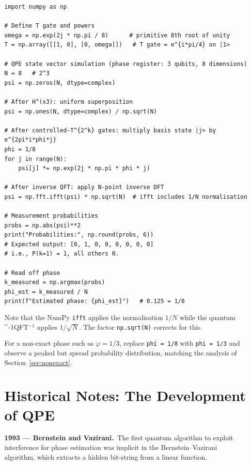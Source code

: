 \documentclass[12pt,a4paper]{article}
\newcommand{\IQFT}{\ifmmode \text{\textsc{QFT}}^{-1}\else \textsc{QFT}$^{-1}$\fi}
\begin{document}
\begin{verbatim}
import numpy as np

# Define T gate and powers
omega = np.exp(2j * np.pi / 8)      # primitive 8th root of unity
T = np.array([[1, 0], [0, omega]])   # T gate = e^{i*pi/4} on |1>

# QPE state vector simulation (phase register: 3 qubits, 8 dimensions)
N = 8   # 2^3
psi = np.zeros(N, dtype=complex)

# After H^(x3): uniform superposition
psi = np.ones(N, dtype=complex) / np.sqrt(N)

# After controlled-T^{2^k} gates: multiply basis state |j> by e^{2pi*i*phi*j}
phi = 1/8
for j in range(N):
    psi[j] *= np.exp(2j * np.pi * phi * j)

# After inverse QFT: apply N-point inverse DFT
psi = np.fft.ifft(psi) * np.sqrt(N)  # ifft includes 1/N normalisation

# Measurement probabilities
probs = np.abs(psi)**2
print("Probabilities:", np.round(probs, 6))
# Expected output: [0, 1, 0, 0, 0, 0, 0, 0]
# i.e., P(k=1) = 1, all others 0.

# Read off phase
k_measured = np.argmax(probs)
phi_est = k_measured / N
print(f"Estimated phase: {phi_est}")   # 0.125 = 1/8
\end{verbatim}

Note that the NumPy \texttt{ifft} applies the normalisation $1/N$ while
the quantum \IQFT{} applies $1/\sqrt{N}$.  The factor \texttt{np.sqrt(N)}
corrects for this.

For a non-exact phase such as $\varphi = 1/3$, replace \texttt{phi = 1/8}
with \texttt{phi = 1/3} and observe a peaked but spread probability distribution,
matching the analysis of Section~\ref{sec:nonexact}.

\newpage

\section{Historical Notes: The Development of QPE}
\label{app:history}

\textbf{1993 — Bernstein and Vazirani.}\ The first quantum algorithm to exploit
interference for phase estimation was implicit in the Bernstein--Vazirani
algorithm, which extracts a hidden bit-string from a linear function.
\end{document}
